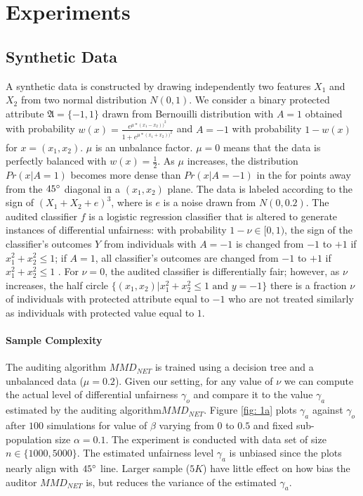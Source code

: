 \documentclass{article}
\begin{document}
\section{Experiments}

\subsection{Synthetic Data}
A synthetic data is constructed by drawing independently two features $X_{1}$ and $X_{2}$ from two normal distribution $N(0, 1)$. We consider a binary protected attribute  $\mathfrak{A}=\{-1, 1\}$ drawn from Bernouilli distribution with $A=1$ obtained with probability $w(x)=\frac{e^{\mu * (x_{1}- x_{2}))^{2}}}{1 + e^{\mu * (x_{1}+ x_{2}))^{2}}}$ and $A=-1$ with probability $1-w(x)$ for $x=(x_{1}, x_{2})$. $\mu$ is an unbalance factor. $\mu=0$ means that the data is perfectly balanced with $w(x)=\frac{1}{2}$. As $\mu$ increases, the distribution $Pr(x|A=1)$ becomes more dense than $Pr(x|A=-1)$ in the for points away from the $45\degree$ diagonal in a $(x_{1}, x_{2})$ plane. The data is labeled according to the sign of $(X_{1} + X_{2} + e) ^{3}$, where is $e$ is a noise drawn from $N(0, 0.2)$. The audited classifier $f$ is a logistic regression classifier that is altered to generate instances of differential unfairness: with probability $1-\nu\in[0, 1)$, the sign of the classifier's outcomes $Y$ from individuals with $A=-1$ is changed from $-1$ to $+1$ if $x^{2}_{1} + x^{2}_{2} \leq 1$; if $A=1$, all classifier's outcomes are changed from $-1$ to $+1$ if $x^{2}_{1} + x^{2}_{2} \leq 1$ . For $\nu=0$, the audited classifier is differentially fair; however, as $\nu$ increases, the half circle $\{(x_{1}, x_{2})|x^{2}_{1} + x^{2}_{2} \leq 1 \mbox{ and } y=-1\}$ there is a fraction $\nu$ of individuals with protected attribute equal to $-1$ who are not treated similarly as individuals with protected value equal to $1$. 

\bigskip
\paragraph{Sample Complexity}
The auditing algorithm $MMD_{NET}$ is trained using a decision tree and a unbalanced data ($\mu=0.2$). Given our setting, for any value of $\nu$ we can compute the actual level of differential unfairness $\gamma_{o}$ and compare it to the value  $\gamma_{a}$ estimated by the auditing algorithm$MMD_{NET}$.  Figure \ref{fig: 1a} plots $\gamma_{a}$ against $\gamma_{o}$ after $100$ simulations for value of $\beta$ varying from $0$ to $0.5$ and fixed sub-population size $\alpha=0.1$. The experiment is conducted with data set of size $n\in \{1000, 5000\}$. The estimated unfairness level $\gamma_{a}$ is unbiased since the plots nearly align with $45\degree$ line. Larger sample ($5K$) have little effect on how bias the auditor $MMD_{NET}$ is, but reduces the variance of the estimated $\gamma_{a}$.  
\end{document}
